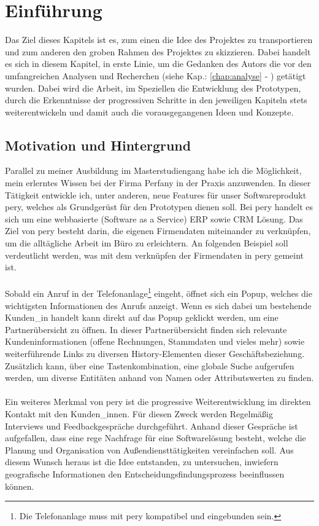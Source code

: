 \documentclass[Bachelorarbeit.tex]{subfiles}
\begin{document}
\chapter{Einführung}
\label{chap:einfuehrung}

Das Ziel dieses Kapitels ist es, zum einen die Idee des Projektes zu transportieren und zum anderen den groben Rahmen des Projektes zu skizzieren.
Dabei handelt es sich in diesem Kapitel, in erste Linie, um die Gedanken des Autors die vor den umfangreichen Analysen und Recherchen (siehe Kap.: \ref{chap:analyse} - ) getätigt wurden.
Dabei wird die Arbeit, im Speziellen die Entwicklung des Prototypen, durch die Erkenntnisse der progressiven Schritte in den jeweiligen Kapiteln stets weiterentwickeln und damit auch die vorausgegangenen Ideen und Konzepte.


\section{Motivation und Hintergrund}
\label{chap:einfuehrung:sec:hintergrund}
Parallel zu meiner Ausbildung im Masterstudiengang habe ich die Möglichkeit, mein erlerntes Wissen bei der Firma Perfany in der Praxis anzuwenden.
In dieser Tätigkeit entwickle ich, unter anderen, neue Features für unser Softwareprodukt pery, welches als Grundgerüst für den Prototypen dienen soll.
Bei pery handelt es sich um eine webbasierte (Software as a Service) \ac{ERP} sowie \ac{CRM} Lösung.
Das Ziel von pery besteht darin, die eigenen Firmendaten miteinander zu verknüpfen, um die alltägliche Arbeit im Büro zu erleichtern.
An folgenden Beispiel soll verdeutlicht werden, was mit dem verknüpfen der Firmendaten in pery gemeint ist.\\
\\
Sobald ein Anruf in der Telefonanlage\footnote{Die Telefonanlage muss mit pery kompatibel und eingebunden sein.} eingeht, öffnet sich ein Popup, welches die wichtigsten Informationen des Anrufs anzeigt. 
Wenn es sich dabei um bestehende Kunden\_in handelt kann direkt auf das Popup geklickt werden, um eine Partnerübersicht zu öffnen.
In dieser Partnerübersicht finden sich relevante Kundeninformationen (offene Rechnungen, Stammdaten und vieles mehr) sowie weiterführende Links zu diversen History-Elementen dieser Geschäftsbeziehung.
Zusätzlich kann, über eine Tastenkombination, eine globale Suche aufgerufen werden, um diverse Entitäten anhand von Namen oder Attributswerten zu finden. \\
\\
Ein weiteres Merkmal von pery ist die progressive Weiterentwicklung im direkten Kontakt mit den Kunden\_innen.
Für diesen Zweck werden Regelmäßig Interviews und Feedbackgespräche durchgeführt.
Anhand dieser Gespräche ist aufgefallen, dass eine rege Nachfrage für eine Softwarelösung besteht, welche die Planung und Organisation von Außendiensttätigkeiten vereinfachen soll.
Aus diesem Wunsch heraus ist die Idee entstanden, zu untersuchen, inwiefern geografische Informationen den Entscheidungsfindungsprozess beeinflussen können.
\end{document}
